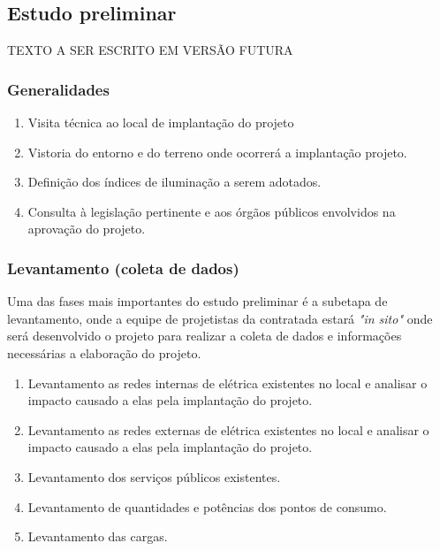 \subsection{Estudo preliminar} \label{subsection: estudo preliminar}

TEXTO A SER ESCRITO EM VERSÃO FUTURA

\subsubsection{Generalidades}

	\begin{enumerate}\label{subsection: EP-generalidades}
		\item Visita técnica ao local de implantação do projeto

		\item Vistoria do entorno e do terreno onde ocorrerá a implantação projeto.
		
		\item Definição dos índices de iluminação a serem adotados.
		
		\item Consulta à legislação pertinente e aos órgãos públicos envolvidos na aprovação do projeto.
	\end{enumerate}

\subsubsection{Levantamento (coleta de dados)}

Uma das fases mais importantes do estudo preliminar é a subetapa de levantamento, onde a equipe de projetistas da contratada estará \textit{"in sito"} onde será desenvolvido o projeto para realizar a coleta de dados e informações necessárias a elaboração do projeto.


\begin{enumerate}\label{subsection: EP-generalidades}
	
	\item Levantamento as redes internas de elétrica existentes no local e analisar o impacto causado a elas pela implantação do projeto. 
	
	\item Levantamento as redes externas de elétrica existentes no local e analisar o impacto causado a elas pela implantação do projeto.
	
	\item Levantamento dos serviços públicos existentes.
	
	\item Levantamento de quantidades e potências dos pontos de consumo.
	
	\item Levantamento das cargas.		

\end{enumerate}


